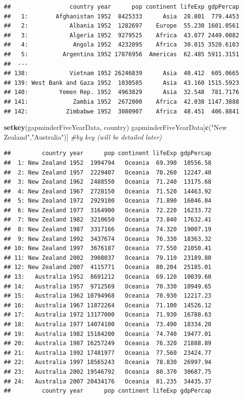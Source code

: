 \documentclass[]{article}
\newenvironment{Shaded}{\begin{snugshade}}{\end{snugshade}}
\newcommand{\KeywordTok}[1]{\textcolor[rgb]{0.13,0.29,0.53}{\textbf{{#1}}}}
\newcommand{\StringTok}[1]{\textcolor[rgb]{0.31,0.60,0.02}{{#1}}}
\newcommand{\CommentTok}[1]{\textcolor[rgb]{0.56,0.35,0.01}{\textit{{#1}}}}
\newcommand{\NormalTok}[1]{{#1}}
\begin{document}
\begin{verbatim}
##                 country year      pop continent lifeExp gdpPercap
##   1:        Afghanistan 1952  8425333      Asia  28.801  779.4453
##   2:            Albania 1952  1282697    Europe  55.230 1601.0561
##   3:            Algeria 1952  9279525    Africa  43.077 2449.0082
##   4:             Angola 1952  4232095    Africa  30.015 3520.6103
##   5:          Argentina 1952 17876956  Americas  62.485 5911.3151
##  ---                                                             
## 138:            Vietnam 1952 26246839      Asia  40.412  605.0665
## 139: West Bank and Gaza 1952  1030585      Asia  43.160 1515.5923
## 140:         Yemen Rep. 1952  4963829      Asia  32.548  781.7176
## 141:             Zambia 1952  2672000    Africa  42.038 1147.3888
## 142:           Zimbabwe 1952  3080907    Africa  48.451  406.8841
\end{verbatim}

\begin{Shaded}
\begin{Highlighting}[]
\KeywordTok{setkey}\NormalTok{(gapminderFiveYearData, country)}
\NormalTok{gapminderFiveYearData[}\KeywordTok{c}\NormalTok{(}\StringTok{"New Zealand"}\NormalTok{,}\StringTok{"Australia"}\NormalTok{)] }\CommentTok{#by key (will be detailed later)}
\end{Highlighting}
\end{Shaded}

\begin{verbatim}
##         country year      pop continent lifeExp gdpPercap
##  1: New Zealand 1952  1994794   Oceania  69.390  10556.58
##  2: New Zealand 1957  2229407   Oceania  70.260  12247.40
##  3: New Zealand 1962  2488550   Oceania  71.240  13175.68
##  4: New Zealand 1967  2728150   Oceania  71.520  14463.92
##  5: New Zealand 1972  2929100   Oceania  71.890  16046.04
##  6: New Zealand 1977  3164900   Oceania  72.220  16233.72
##  7: New Zealand 1982  3210650   Oceania  73.840  17632.41
##  8: New Zealand 1987  3317166   Oceania  74.320  19007.19
##  9: New Zealand 1992  3437674   Oceania  76.330  18363.32
## 10: New Zealand 1997  3676187   Oceania  77.550  21050.41
## 11: New Zealand 2002  3908037   Oceania  79.110  23189.80
## 12: New Zealand 2007  4115771   Oceania  80.204  25185.01
## 13:   Australia 1952  8691212   Oceania  69.120  10039.60
## 14:   Australia 1957  9712569   Oceania  70.330  10949.65
## 15:   Australia 1962 10794968   Oceania  70.930  12217.23
## 16:   Australia 1967 11872264   Oceania  71.100  14526.12
## 17:   Australia 1972 13177000   Oceania  71.930  16788.63
## 18:   Australia 1977 14074100   Oceania  73.490  18334.20
## 19:   Australia 1982 15184200   Oceania  74.740  19477.01
## 20:   Australia 1987 16257249   Oceania  76.320  21888.89
## 21:   Australia 1992 17481977   Oceania  77.560  23424.77
## 22:   Australia 1997 18565243   Oceania  78.830  26997.94
## 23:   Australia 2002 19546792   Oceania  80.370  30687.75
## 24:   Australia 2007 20434176   Oceania  81.235  34435.37
##         country year      pop continent lifeExp gdpPercap
\end{verbatim}
\end{document}
